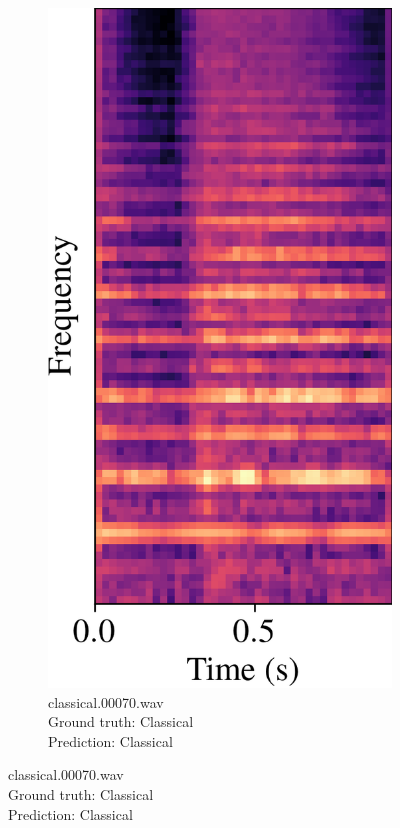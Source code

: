 \documentclass[conference]{IEEEtran}
\begin{document}
\begin{figure}[htbp]
    \centering
    \begin{subfigure}[b]{0.32\columnwidth}
        \centerline{\includegraphics[width=\columnwidth]{spec_correct.png}}
        \caption{classical.00070.wav\\Ground truth: Classical\\Prediction: Classical}

\end{subfigure}
\end{figure}
\end{document}
